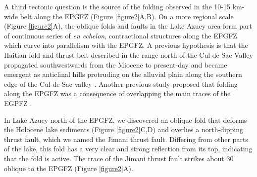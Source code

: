 \documentclass{nature}
\begin{document}
A third tectonic question is the source of the folding observed in the 10-15 km-wide belt along the EPGFZ (Figure \ref{figure2}A,B). On a more regional scale (Figure \ref{figure2}A), the oblique folds and faults in the Lake Azuey area form part of continuous series of \textit{en echelon}, contractional structures along the EPGFZ which curve into parallelism with the EPGFZ. A previous hypothesis is that the Haitian fold-and-thrust belt described in the range north of the Cul-de-Sac Valley \citep{pubellier2000plate} propagated southwestwards from the Miocene to present-day and became emergent as anticlinal hills protruding on the alluvial plain along the southern edge of the Cul-de-Sac valley \citep{calais2010transpressional}. Another previous study proposed that folding along the EPGFZ was a consequence of overlapping the main traces of the EGPFZ \citep{cowgill2012interactive}. 

In Lake Azuey north of the EPGFZ, we discovered an oblique fold that deforms the Holocene lake sediments (Figure \ref{figure2}C,D) and overlies a north-dipping thrust fault, which we named the Jimani thrust fault. Differing from other parts of the lake, this fold has a very clear and strong reflection from its top, indicating that the fold is active. The trace of the Jimani thrust fault strikes about $30^{\circ}$ oblique to the EPGFZ (Figure \ref{figure2}A). 
\end{document}
